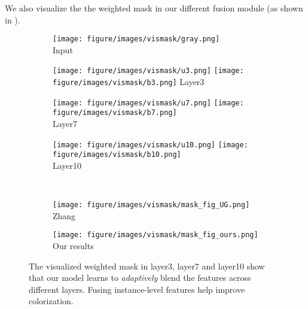 {We also visualize the the weighted mask in our different fusion module (as shown in ).
\begin{figure}[!t]
    \begin{subfigure}[!t]{.39\linewidth}\centering
       \texttt{[image: figure/images/vismask/gray.png]}\\
       {Input}
    \end{subfigure}
    \begin{subfigure}[!t]{.19\linewidth}\centering
       \texttt{[image: figure/images/vismask/u3.png]}
       \texttt{[image: figure/images/vismask/b3.png]}
       {Layer3}
    \end{subfigure}
    \begin{subfigure}[!t]{.19\linewidth}\centering
       \texttt{[image: figure/images/vismask/u7.png]}
       \texttt{[image: figure/images/vismask/b7.png]}\\
       {Layer7}
    \end{subfigure}
    \begin{subfigure}[!t]{.19\linewidth}\centering
       \texttt{[image: figure/images/vismask/u10.png]}
       \texttt{[image: figure/images/vismask/b10.png]}\\
       {Layer10}
    \end{subfigure}
    \\
    \begin{subfigure}[!t]{0.49\linewidth}\centering
        \texttt{[image: figure/images/vismask/mask\_fig\_UG.png]}
        {Zhang~\etal~\cite{Zhang-SIGGRAPH-2017}}
    \end{subfigure}
    \begin{subfigure}[!t]{0.49\linewidth}\centering
        \texttt{[image: figure/images/vismask/mask\_fig\_ours.png]}
        {Our results}
    \end{subfigure}
    \caption{ The visualized weighted mask in layer3, layer7 and layer10 show that our model learns to \emph{adaptively} blend the features across different layers. Fusing instance-level features help improve colorization.}
    \label{fig:vismask}
\end{figure} 
\begin{table*}[t!]
    \centering

\end{table*}}
